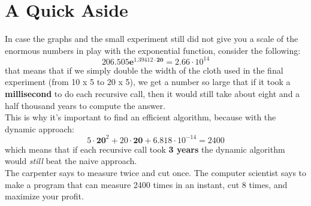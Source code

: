 \documentclass[paper=a4, fontsize=11pt]{scrartcl} %
\numberwithin{equation}{section} %
\numberwithin{figure}{section} %
\numberwithin{table}{section} %
\begin{document}
\section{A Quick Aside}
In case the graphs and the small experiment still did not give you a scale of the enormous numbers in play with the exponential function, consider the following:
\[
	206.505\mathbf{e}^{1.39412 \cdot \mathbf{20}} = 2.66 \cdot 10^{14}
\]
that means that if we simply double the width of the cloth used in the final experiment (from 10 x 5 to 20 x 5), we get a number so large that if it took a \textbf{millisecond} to do each recursive call, then it would still take about eight and a half thousand years to compute the answer. \\
\indent This is why it's important to find an efficient algorithm, because with the dynamic approach:
\[
	5 \cdot \mathbf{20}^2 + 20 \cdot \mathbf{20} + 6.818 \cdot 10^{-14} = 2400
\]
which means that if each recursive call took \textbf{3 years} the dynamic algorithm would \emph{still} beat the naive approach.\\
\indent The carpenter says to measure twice and cut once. The computer scientist says to make a program that can measure 2400 times in an instant, cut 8 times, and maximize your profit.
\end{document}
